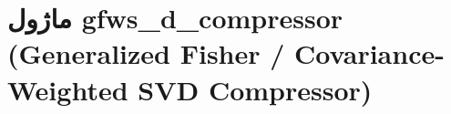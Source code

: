 \section{ماژول gfws\_d\_compressor (Generalized Fisher / Covariance-Weighted SVD Compressor)}
\label{sec:module_gfws_d_compressor}

